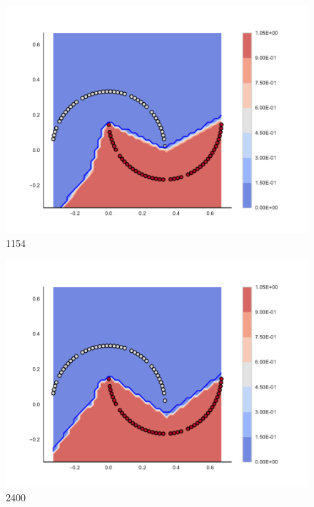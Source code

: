 
\begin{subfigure}[b]{0.12\textwidth}
    \includegraphics[clip, trim=2.35cm 1.75cm 4.5cm 0cm,width=\textwidth]{img/convergence/1154.pdf}
    \caption{1154}
    \label{fig:convergence_1154}
\end{subfigure}
%
\begin{subfigure}[b]{0.12\textwidth}
    \includegraphics[clip, trim=2.35cm 1.75cm 4.5cm 0cm,width=\textwidth]{img/convergence/2400.pdf}
    \caption{2400}
    \label{fig:convergence_2400}
\end{subfigure}
%
